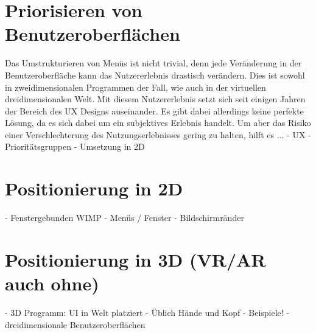 	\section{Priorisieren von Benutzeroberflächen}
		Das Umstrukturieren von Menüs ist nicht trivial, denn jede Veränderung in der Benutzeroberfläche kann das Nutzererlebnis drastisch verändern. Dies ist sowohl in zweidimensionalen Programmen der Fall, wie auch in der virtuellen dreidimensionalen Welt. Mit diesem Nutzererlebnis setzt sich seit einigen Jahren der Bereich des UX Designs auseinander. Es gibt dabei allerdings keine perfekte Lösung, da es sich dabei um ein subjektives Erlebnis handelt.
		Um aber das Risiko einer Verschlechterung des Nutzungserlebnisses gering zu halten, hilft es ... 
		- UX
		- Prioritätsgruppen
		- Umsetzung in 2D
		
	\section{Positionierung in 2D}
		- Fenstergebunden WIMP
		- Menüs / Fenster
		- Bildschirmränder
		
	\section{Positionierung in 3D (VR/AR auch ohne)}
		- 3D Programm: UI in Welt platziert
		- Üblich Hände und Kopf 
		- Beispiele!
		- dreidimensionale Benutzeroberflächen